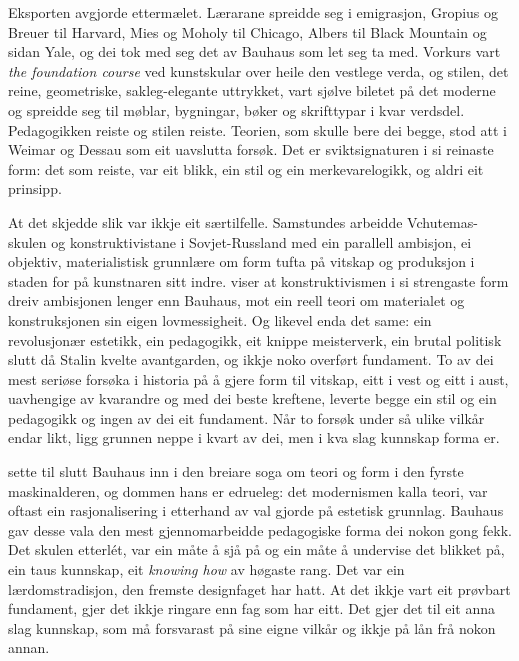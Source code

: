 Eksporten avgjorde ettermælet. Lærarane spreidde seg i emigrasjon, Gropius og Breuer til Harvard, Mies og Moholy til Chicago, Albers til Black Mountain og sidan Yale, og dei tok med seg det av Bauhaus som let seg ta med. Vorkurs vart \emph{the foundation course} ved kunstskular over heile den vestlege verda, og stilen, det reine, geometriske, sakleg-elegante uttrykket, vart sjølve biletet på det moderne og spreidde seg til møblar, bygningar, bøker og skrifttypar i kvar verdsdel. Pedagogikken reiste og stilen reiste. Teorien, som skulle bere dei begge, stod att i Weimar og Dessau som eit uavslutta forsøk. Det er sviktsignaturen i si reinaste form: det som reiste, var eit blikk, ein stil og ein merkevarelogikk, og aldri eit prinsipp.

At det skjedde slik var ikkje eit særtilfelle. Samstundes arbeidde Vchutemas-skulen og konstruktivistane i Sovjet-Russland med ein parallell ambisjon, ei objektiv, materialistisk grunnlære om form tufta på vitskap og produksjon i staden for på kunstnaren sitt indre. \textcite{lodder1983} viser at konstruktivismen i si strengaste form dreiv ambisjonen lenger enn Bauhaus, mot ein reell teori om materialet og konstruksjonen sin eigen lovmessigheit. Og likevel enda det same: ein revolusjonær estetikk, ein pedagogikk, eit knippe meisterverk, ein brutal politisk slutt då Stalin kvelte avantgarden, og ikkje noko overført fundament. To av dei mest seriøse forsøka i historia på å gjere form til vitskap, eitt i vest og eitt i aust, uavhengige av kvarandre og med dei beste kreftene, leverte begge ein stil og ein pedagogikk og ingen av dei eit fundament. Når to forsøk under så ulike vilkår endar likt, ligg grunnen neppe i kvart av dei, men i kva slag kunnskap forma er.

\textcite{banham1960} sette til slutt Bauhaus inn i den breiare soga om teori og form i den fyrste maskinalderen, og dommen hans er edrueleg: det modernismen kalla teori, var oftast ein rasjonalisering i etterhand av val gjorde på estetisk grunnlag. Bauhaus gav desse vala den mest gjennomarbeidde pedagogiske forma dei nokon gong fekk. Det skulen etterlét, var ein måte å sjå på og ein måte å undervise det blikket på, ein taus kunnskap, eit \emph{knowing how} av høgaste rang. Det var ein lærdomstradisjon, den fremste designfaget har hatt. At det ikkje vart eit prøvbart fundament, gjer det ikkje ringare enn fag som har eitt. Det gjer det til eit anna slag kunnskap, som må forsvarast på sine eigne vilkår og ikkje på lån frå nokon annan.

\vignett

